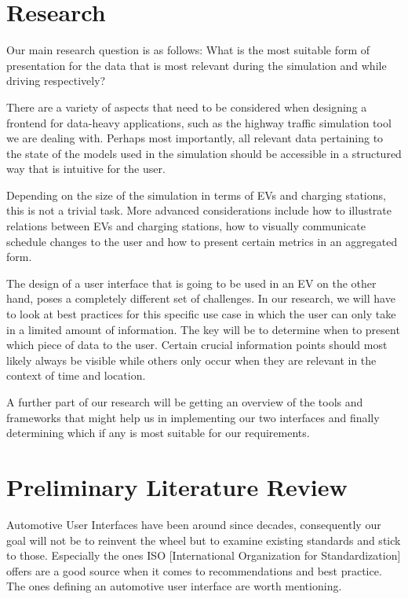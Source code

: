 \documentclass[hidelinks]{sig-alternate}
\begin{document}
\section{Research}

Our main research question is as follows: What is the most suitable form of presentation for the data that is most
relevant during the simulation and while driving respectively?

There are a variety of aspects that need to be considered when designing a frontend for data-heavy applications,
such as the highway traffic simulation tool we are dealing with. Perhaps most importantly, all relevant data
pertaining to the state of the models used in the simulation should be accessible in a structured way that is intuitive
for the user.

Depending on the size of the simulation in terms of EVs and charging stations, this is not a trivial
task. More advanced considerations include how to illustrate relations between EVs and charging stations, how to
visually communicate schedule changes to the user and how to present certain metrics in an aggregated form.

The design of a user interface that is going to be used in an EV on the other hand, poses a completely different set
of challenges. In our research, we will have to look at best practices for this specific use case in which the user
can only take in a limited amount of information. The key will be to determine when to present which piece of
data to the user. Certain crucial information points should most likely always be visible while others only occur
when they are relevant in the context of time and location.

A further part of our research will be getting an overview of the tools and frameworks that might help us in
implementing our two interfaces and finally determining which if any is most suitable for our requirements.


\section{Preliminary Literature Review}

Automotive User Interfaces have been around since decades, consequently our goal will not be to reinvent the wheel
but to examine existing standards and stick to those. Especially the ones ISO [International Organization for
Standardization] offers are a good source when it comes to recommendations and best practice. The ones defining an
automotive user interface are worth mentioning\cite{4}.
\end{document}
